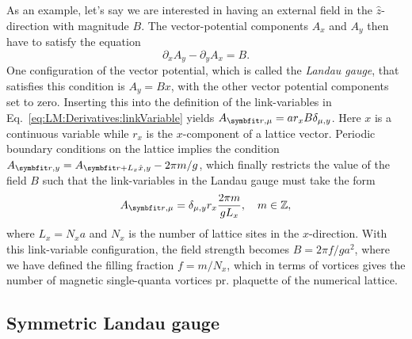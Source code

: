 As an example, let's say we are interested in having an external field in the $\hat{z}$-direction with magnitude $B$. The vector-potential components $A_x$ and $A_y$ then have to satisfy
the equation
\begin{equation}
    \label{eq:LM:Field:vectorPotentialCondition}
    \partial_xA_y - \partial_yA_x = B.
\end{equation}
One configuration of the vector potential, which is called the \emph{Landau gauge}, that satisfies this condition is $A_y = Bx$, with the other vector potential components set to zero. Inserting
this into the definition of the link-variables in Eq.~\eqref{eq:LM:Derivatives:linkVariable} yields $A_{\v{r},\mu} = ar_xB\delta_{\mu,y}$. Here $x$ is a continuous variable while
$r_x$ is the $x$-component of a lattice vector. Periodic boundary conditions on the lattice implies the condition $A_{\v{r},y} = A_{\v{r}+L_x\hat{x},y} - 2\pi m/g$,
which finally restricts the value of the field $B$ such that the link-variables in the Landau
gauge must take the form
\begin{equation}
    \label{eq:LM:Field:LandauGauge}
    A_{\v{r},\mu} = \delta_{\mu,y}r_x\frac{2\pi m}{gL_x},\quad m\in\mathbb{Z},
\end{equation}
where $L_x=N_xa$ and $N_x$ is the number of lattice sites in the $x$-direction. With this link-variable configuration, the field strength becomes $B = 2\pi f/ga^2$, where we have defined
the filling fraction $f=m/N_x$, which in terms of vortices gives the number of magnetic single-quanta vortices pr. plaquette of the numerical lattice.

\subsection{Symmetric Landau gauge}
\label{sec:LM:Field:SymmLandauGauge}

